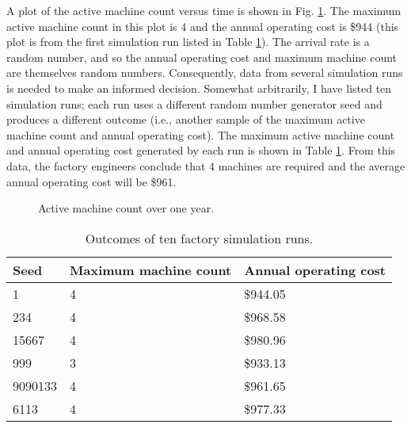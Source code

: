 A plot of the active machine count versus time is shown in Fig. \ref{fig:active_machine_plot}. The maximum active machine count in this plot is 4 and the annual operating cost is \$944 (this plot is from the first simulation run listed in Table \ref{tab:monte_carlo_outcome}).
The arrival rate is a random number, and so the annual operating cost and maximum machine count are themselves random numbers. Consequently, data from several simulation runs is needed to make an informed decision. Somewhat arbitrarily, I have listed ten simulation runs; each run uses a different random number generator seed and produces a different outcome (i.e., another sample of the maximum active machine count and annual operating cost). The maximum active machine count and annual operating cost generated by each run is shown in Table \ref{tab:monte_carlo_outcome}. From this data, the factory engineers conclude that 4 machines are required and the average annual operating cost will be \$961.
\begin{figure}[ht]
\centering
{}
\caption{Active machine count over one year.}
\label{fig:active_machine_plot}
\end{figure}
\begin{table}[ht]
\centering
\begin{tabular}{|l|l|l|}
\hline
Seed & Maximum machine count & Annual operating cost \\ \hline
1 & 4 & \$944.05 \\ \hline
234 & 4 & \$968.58 \\ \hline
15667 & 4 & \$980.96 \\ \hline
999 & 3 & \$933.13 \\ \hline
9090133 & 4 & \$961.65 \\ \hline
6113 & 4 & \$977.33 \\ \hline
\end{tabular}
\caption{Outcomes of ten factory simulation runs.}
\label{tab:monte_carlo_outcome}
\end{table}

